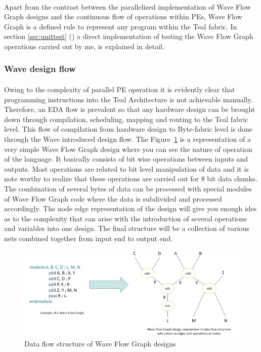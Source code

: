 \paragraph{}
Apart from the contrast between the parallelized implementation of Wave Flow Graph designs and the continuous flow of operations within PEs, Wave Flow Graph is a defined rule to represent any program within the Teal fabric. In section \ref{sec:unittest} () a direct implementation of testing the Wave Flow Graph operations carried out by me, is explained in detail.

\subsubsection{Wave design flow}
\paragraph{}
Owing to the complexity of parallel PE operation it is evidently clear that programming instructions into the Teal Architecture is not achievable manually. Therefore, an EDA flow is prevalent so that any hardware design can be brought down through compilation, scheduling, mapping and routing to the Teal fabric level. This flow of compilation from hardware design to Byte-fabric level is done through the Wave introduced design flow. The Figure~\ref{Fig:wfgstruct} is a representation of a very simple Wave Flow Graph design where you can see the nature of operation of the language. It basically consists of bit wise operations between inputs and outputs. Most operations are related to bit level manipulation of data and it is note worthy to realize that these operations are carried out for 8 bit data chunks. The combination of several bytes of data can be processed with special modules of Wave Flow Graph code where the data is subdivided and processed accordingly. The node edge representation of the design will give you enough ides as to the complexity that can arise with the introduction of several operations and variables into one design. The final structure will be a collection of various nets combined together from input end to output end.

\begin{figure}[H]
    \centering
    \includegraphics[trim=0cm 0cm 0cm 0cm, clip=true,scale=0.5]{figures/wfg_struct.jpg}
    \caption{Data flow structure of Wave Flow Graph designs\label{Fig:wfgstruct}}\vspace{-4mm}
    \end{figure}

\pagebreak